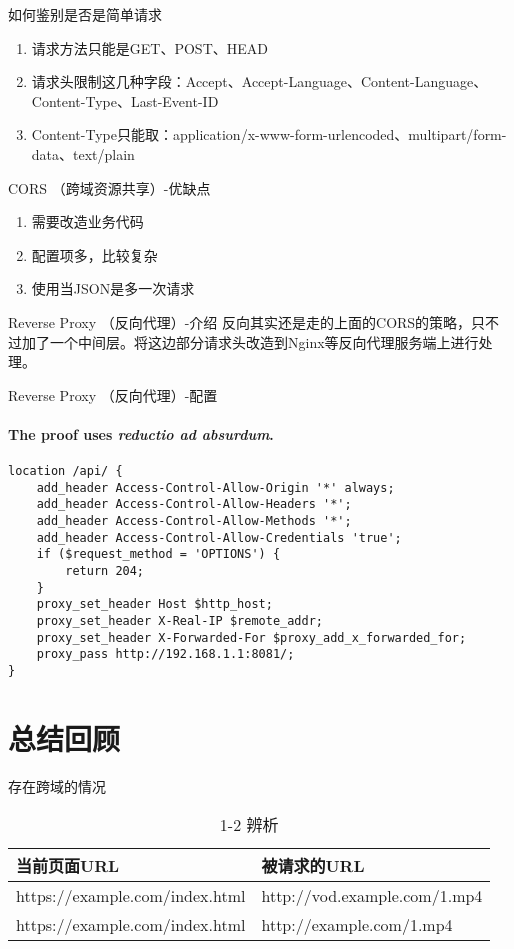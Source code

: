 \documentclass[aspectratio=169,xcolor=dvipsnames,UTF8]{beamer}
\begin{document}
	\begin{frame}{如何鉴别是否是简单请求}
		\begin{enumerate}
			\item 请求方法只能是GET、POST、HEAD
			\item 请求头限制这几种字段：Accept、Accept-Language、Content-Language、Content-Type、Last-Event-ID 
			\item Content-Type只能取：application/x-www-form-urlencoded、multipart/form-data、text/plain
		\end{enumerate}
	\end{frame}
	
	\begin{frame}{CORS （跨域资源共享）-优缺点}
		\begin{enumerate}
			\item 需要改造业务代码
			\item 配置项多，比较复杂
			\item 使用当JSON是多一次请求
		\end{enumerate}
	\end{frame}
	
	\begin{frame}{ Reverse Proxy （反向代理）-介绍}
		反向其实还是走的上面的CORS的策略，只不过加了一个中间层。将这边部分请求头改造到Nginx等反向代理服务端上进行处理。
	\end{frame}
	
	\begin{frame}[fragile]{ Reverse Proxy （反向代理）-配置}
		\framesubtitle{The proof uses \textit{reductio ad absurdum}.}
		\begin{lstlisting}
location /api/ {
	add_header Access-Control-Allow-Origin '*' always;
	add_header Access-Control-Allow-Headers '*';
	add_header Access-Control-Allow-Methods '*';
	add_header Access-Control-Allow-Credentials 'true';
	if ($request_method = 'OPTIONS') {
		return 204;
	}
	proxy_set_header Host $http_host;
	proxy_set_header X-Real-IP $remote_addr;
	proxy_set_header X-Forwarded-For $proxy_add_x_forwarded_for;
	proxy_pass http://192.168.1.1:8081/;
}			
		\end{lstlisting}
	\end{frame}
	\section{总结回顾}
	\begin{frame}{存在跨域的情况}
		\begin{table}
			\begin{tabular}{l l }
				\toprule
				\textbf{当前页面URL}       & \textbf{被请求的URL}        \\
				\midrule
				https://example.com/index.html &  http://vod.example.com/1.mp4     \\
				https://example.com/index.html &  http://example.com/1.mp4         \\
				\bottomrule
			\end{tabular}
			\caption{1-2 辨析}
		\end{table}
	\end{frame}
	
\end{document}
